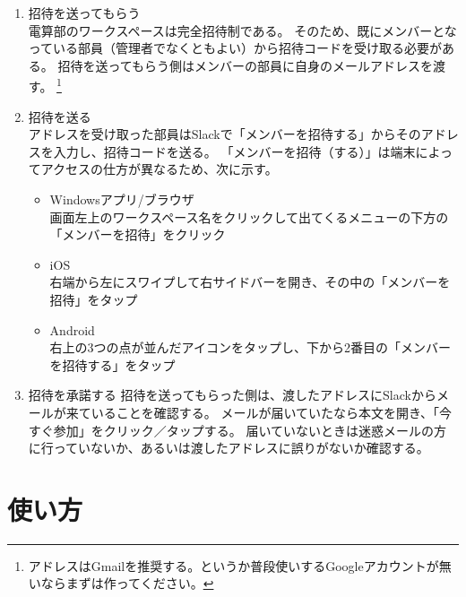 \documentclass[lualatex,ja=standard,12pt,a4j]{bxjsbook}
\begin{document}
            \begin{enumerate}
            	\item 招待を送ってもらう\\
                	電算部のワークスペースは完全招待制である。
                    そのため、既にメンバーとなっている部員（管理者でなくともよい）から招待コードを受け取る必要がある。
                    招待を送ってもらう側はメンバーの部員に自身のメールアドレスを渡す。
                    \footnote{アドレスはGmailを推奨する。というか普段使いするGoogleアカウントが無いならまずは作ってください。}
                \item 招待を送る\\
                	アドレスを受け取った部員はSlackで「メンバーを招待する」からそのアドレスを入力し、招待コードを送る。
                    「メンバーを招待（する）」は端末によってアクセスの仕方が異なるため、次に示す。
                    \begin{itemize}
                    	\item Windowsアプリ/ブラウザ\\
                        	画面左上のワークスペース名をクリックして出てくるメニューの下方の「メンバーを招待」をクリック
                        \item iOS\\
                        	右端から左にスワイプして右サイドバーを開き、その中の「メンバーを招待」をタップ
                        \item Android\\
                        	右上の3つの点が並んだアイコンをタップし、下から2番目の「メンバーを招待する」をタップ
                    \end{itemize}
                \item 招待を承諾する
                	招待を送ってもらった側は、渡したアドレスにSlackからメールが来ていることを確認する。
                    メールが届いていたなら本文を開き、「今すぐ参加」をクリック／タップする。
                    届いていないときは迷惑メールの方に行っていないか、あるいは渡したアドレスに誤りがないか確認する。
            \end{enumerate}
            
   		\section{使い方}
\end{document}
